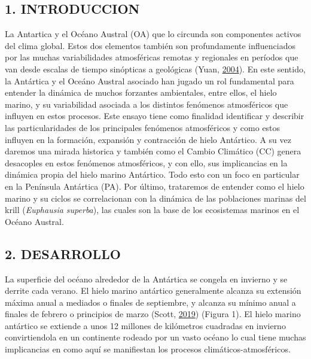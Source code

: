 \documentclass[
]{article}
\begin{document}
\hypertarget{introduccion}{%
\subsection{1. INTRODUCCION}\label{introduccion}}

La Antartica y el Océano Austral (OA) que lo circunda son componentes
activos del clima global. Estos dos elementos también son profundamente
influenciados por las muchas variabilidades atmosféricas remotas y
regionales en períodos que van desde escalas de tiempo sinópticas a
geológicas (Yuan, \protect\hyperlink{ref-Yuan2004}{2004}). En este
sentido, la Antártica y el Oceáno Austral asociado han jugado un rol
fundamental para entender la dinámica de muchos forzantes ambientales,
entre ellos, el hielo marino, y su variabilidad asociada a los distintos
fenómenos atmosféricos que influyen en estos procesos. Este ensayo tiene
como finalidad identificar y describir las particularidades de los
principales fenómenos atmosféricos y como estos influyen en la
formación, expansión y contracción de hielo Antártico. A su vez daremos
una mirada historica y también como el Cambio Climático (CC) genera
desacoples en estos fenómenos atmosféricos, y con ello, sus implicancias
en la dinámica propia del hielo marino Antártico. Todo esto con un foco
en particular en la Península Antártica (PA). Por último, trataremos de
entender como el hielo marino y su ciclos se correlacionan con la
dinámica de las poblaciones marinas del krill (\emph{Euphausia
superba}), las cuales son la base de los ecosistemas marinos en el
Océano Austral.

\pagebreak

\hypertarget{desarrollo}{%
\subsection{2. DESARROLLO}\label{desarrollo}}

La superficie del océano alrededor de la Antártica se congela en
invierno y se derrite cada verano. El hielo marino antártico
generalmente alcanza su extensión máxima anual a mediados o finales de
septiembre, y alcanza su mínimo anual a finales de febrero o principios
de marzo (Scott, \protect\hyperlink{ref-Scott2019}{2019}) (Figura 1). El
hielo marino antártico se extiende a unos 12 millones de kilómetros
cuadradas en invierno convirtiendola en un continente rodeado por un
vasto océano lo cual tiene muchas implicancias en como aquí se
manifiestan los procesos climáticos-atmosféricos.
\end{document}
